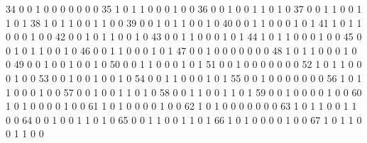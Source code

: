 \documentclass[compress,8pt]{beamer}
\begin{document}
\begin{frame}
\begin{Schunk}
  34       0       0   1              0        0    0       0       0   0   0
  35       1       0   1              1        0    0       0       1   0   0
  36       0       0   1              0        0    1       1       0   1   0
  37       0       0   1              1        0    0       1       1   0   1
  38       1       0   1              1        0    0       1       1   0   0
  39       0       0   1              0        1    1       0       0   1   0
  40       0       0   1              1        0    0       0       1   0   1
  41       1       0   1              1        0    0       0       1   0   0
  42       0       0   1              0        1    1       0       0   1   0
  43       0       0   1              1        0    0       0       1   0   1
  44       1       0   1              1        0    0       0       1   0   0
  45       0       0   1              0        1    1       0       0   1   0
  46       0       0   1              1        0    0       0       1   0   1
  47       0       0   1              0        0    0       0       0   0   0
  48       1       0   1              1        0    0       0       1   0   0
  49       0       0   1              0        0    1       0       0   1   0
  50       0       0   1              1        0    0       0       1   0   1
  51       0       0   1              0        0    0       0       0   0   0
  52       1       0   1              1        0    0       0       1   0   0
  53       0       0   1              0        0    1       0       0   1   0
  54       0       0   1              1        0    0       0       1   0   1
  55       0       0   1              0        0    0       0       0   0   0
  56       1       0   1              1        0    0       0       1   0   0
  57       0       0   1              0        0    1       1       0   1   0
  58       0       0   1              1        0    0       1       1   0   1
  59       0       0   1              0        0    0       0       1   0   0
  60       1       0   1              0        0    0       0       1   0   0
  61       1       0   1              0        0    0       0       1   0   0
  62       1       0   1              0        0    0       0       0   0   0
  63       1       0   1              1        0    0       1       1   0   0
  64       0       0   1              0        0    1       1       0   1   0
  65       0       0   1              1        0    0       1       1   0   1
  66       1       0   1              0        0    0       0       1   0   0
  67       1       0   1              1        0    0       1       1   0   0

\end{Schunk}
\end{frame}
\end{document}
